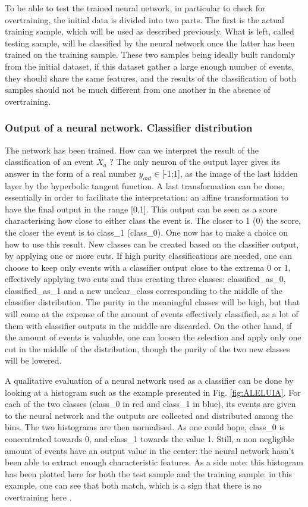 \qquad To be able to test the trained neural network, in particular to check for overtraining, the initial data is divided into two parts. The first is the actual training sample, which will be used as described previously. What is left, called testing sample, will be classified by the neural network once the latter has been trained on the training sample. These two samples being ideally built randomly from the initial dataset, if this dataset gather a large enough number of events, they should share the same features, and the results of the classification of both samples should not be much different from one another in the absence of overtraining.

\subsubsection{Output of a neural network. Classifier distribution}
\qquad The network has been trained. How can we interpret the result of the classification of an event $X_a$ ? The only neuron of the output layer gives its answer in the form of a real number $y_{out}$$\in$[-1;1], as the image of the last hidden layer by the hyperbolic tangent function. A last transformation can be done, essentially in order to facilitate the interpretation: an affine transformation to have the final output in the range [0,1]. This output can be seen as a score characterising how close to either class the event is. The closer to 1 (0) the score, the closer the event is to class\_1 (class\_0). One now has to make a choice on how to use this result. New classes can be created based on the classifier output, by applying one or more cuts. If high purity classifications are needed, one can choose to keep only events with a classifier output close to the extrema 0 or 1, effectively applying two cuts and thus creating three classes: classified\_as\_0, classified\_as\_1 and a new unclear\_class corresponding to the middle of the classifier distribution. The purity in the meaningful classes will be high, but that will come at the expense of the amount of events effectively classified, as a lot of them with classifier outputs in the middle are discarded. On the other hand, if the amount of events is valuable, one can loosen the selection and apply only one cut in the middle of the distribution, though the purity of the two new classes will be lowered.

A qualitative evaluation of a neural network used as a classifier can be done by looking at a histogram such as the example presented in Fig. \ref{fig:ALELUIA}. For each of the two classes (class\_0 in red and class\_1 in blue), its events are given to the neural network and the outputs are collected and distributed among the bins. The two histograms are then normalised. As one could hope, class\_0 is concentrated towards 0, and class\_1 towards the value 1. Still, a non negligible amount of events have an output value in the center: the neural network hasn't been able to extract enough characteristic features. As a side note: this histogram has been plotted here for both the test sample and the training sample: in this example, one can see that both match, which is a sign that there is no overtraining here \citep{hastie_09_elements-of.statistical-learning}.


